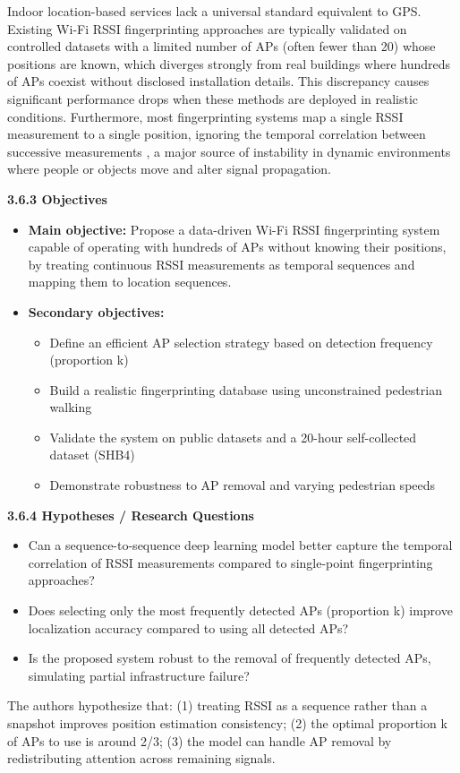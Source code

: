 \documentclass{ipgpmaster}
\begin{document}
Indoor location-based services lack a universal standard equivalent to GPS. Existing Wi-Fi RSSI fingerprinting approaches are typically validated on controlled datasets with a limited number of APs (often fewer than 20) whose positions are known, which diverges strongly from real buildings where hundreds of APs coexist without disclosed installation details. This discrepancy causes significant performance drops when these methods are deployed in realistic conditions. Furthermore, most fingerprinting systems map a single RSSI measurement to a single position, ignoring the temporal correlation between successive measurements ,  a major source of instability in dynamic environments where people or objects move and alter signal propagation.

\textbf{3.6.3    Objectives}

\begin{itemize}
    \item \textbf{Main objective:} Propose a data-driven Wi-Fi RSSI fingerprinting system capable of operating with hundreds of APs without knowing their positions, by treating continuous RSSI measurements as temporal sequences and mapping them to location sequences.
    \item \textbf{Secondary objectives:} 
    \begin{itemize}
        \item Define an efficient AP selection strategy based on detection frequency (proportion k)
        \item Build a realistic fingerprinting database using unconstrained pedestrian walking
        \item Validate the system on public datasets and a 20-hour self-collected dataset (SHB4)
        \item Demonstrate robustness to AP removal and varying pedestrian speeds

    \end{itemize}
\end{itemize}
\textbf{3.6.4    Hypotheses / Research Questions}

\begin{itemize}
    \item Can a sequence-to-sequence deep learning model better capture the temporal correlation of RSSI measurements compared to single-point fingerprinting approaches?
    \item Does selecting only the most frequently detected APs (proportion k) improve localization accuracy compared to using all detected APs?
    \item Is the proposed system robust to the removal of frequently detected APs, simulating partial infrastructure failure?
\end{itemize}
The authors hypothesize that: (1) treating RSSI as a sequence rather than a snapshot improves position estimation consistency; (2) the optimal proportion k of APs to use is around 2/3; (3) the model can handle AP removal by redistributing attention across remaining signals.
\end{document}
